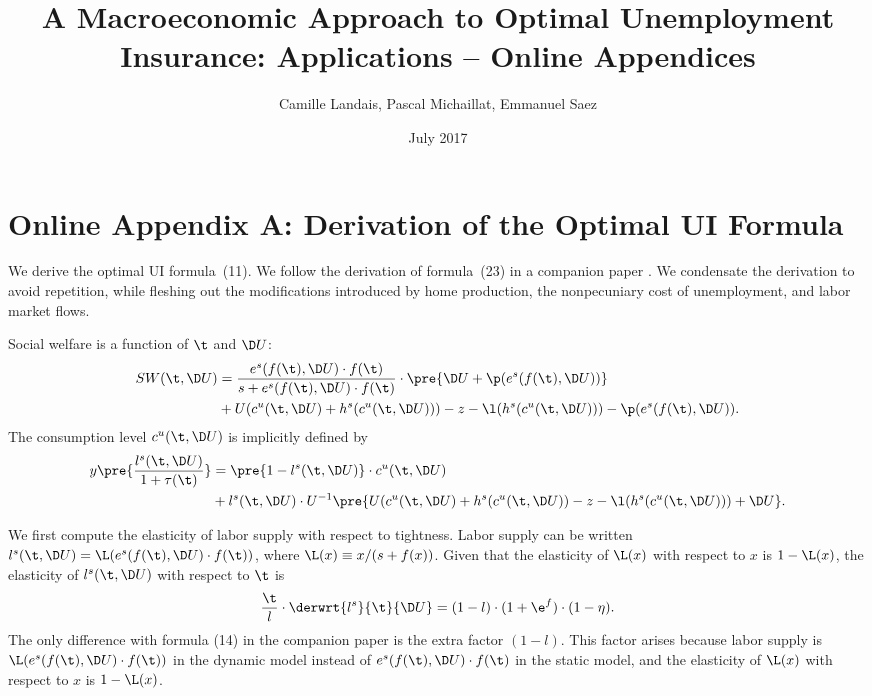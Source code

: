 \documentclass[letterpaper,12pt,leqno]{article}
\begin{document}
\title{\hspace{-0.7cm} A Macroeconomic Approach to Optimal Unemployment Insurance: Applications -- Online Appendices}
\author{Camille Landais, Pascal Michaillat, Emmanuel Saez}
\date{July 2017}                                                                              

\begin{titlepage}
\maketitle
\begin{small}\tableofcontents\end{small}
\end{titlepage}

\section{Online Appendix A: Derivation of the Optimal UI Formula}\label{app:optimal}

We derive the optimal UI formula~(11). We follow the derivation of formula~(23) in a companion paper \citep{LMS}. We condensate the derivation to avoid repetition, while fleshing out the modifications introduced by home production, the nonpecuniary cost of unemployment, and labor market flows.

Social welfare is a function of $\t$ and $\D U$:
\begin{align*}
SW(\t,\D U)&= \frac{e^{s}(f(\t),\D U)\cdot f(\t)}{s+e^{s}(f(\t),\D U)\cdot f(\t)}\cdot \pre{\D U+\p(e^{s}(f(\t),\D U))}\\
&+ U(c^{u}(\t,\D U)+h^{s}(c^{u}(\t,\D U)))-z-\l(h^{s}(c^{u}(\t,\D U)))-\p(e^{s}(f(\t),\D U)).
\end{align*}
The consumption level $c^{u}(\t,\D U)$ is implicitly defined by
\begin{align*}
y\pre{\frac{l^{s}(\t,\D U)}{1+\tau(\t)}}& = \pre{1-l^{s}(\t,\D U)}\cdot c^{u}(\t,\D U)\\
&+l^{s}(\t,\D U)\cdot U^{-1}\pre{U(c^{u}(\t,\D U)+h^{s}(c^{u}(\t,\D U))-z-\l(h^{s}(c^{u}(\t,\D U)))+\D U}.
\end{align*}

We first compute the elasticity of labor supply with respect to tightness. Labor supply can be written $l^{s}(\t,\D U)=\L(e^{s}(f(\t),\D U)\cdot f(\t))$, where $\L(x)\equiv x/(s+f(x))$. Given that the elasticity of $\L(x)$ with respect to $x$ is $1-\L(x)$, the elasticity of $l^{s}(\t,\D U)$ with respect to $\t$ is
\begin{equation}
\frac{\t}{l}\cdot\derwrt{l^{s}}{\t}{\D U}= (1-l)\cdot (1+\e^{f})\cdot (1-\eta).
\label{eq:dls}\end{equation}
The only difference with formula (14) in the companion paper is the extra factor $(1-l)$. This factor arises because labor supply is $\L(e^{s}(f(\t),\D U)\cdot f(\t))$ in the dynamic model instead of $e^{s}(f(\t),\D U)\cdot f(\t)$ in the static model, and the elasticity of $\L(x)$ with respect to $x$ is $1-\L(x)$.
\end{document}
